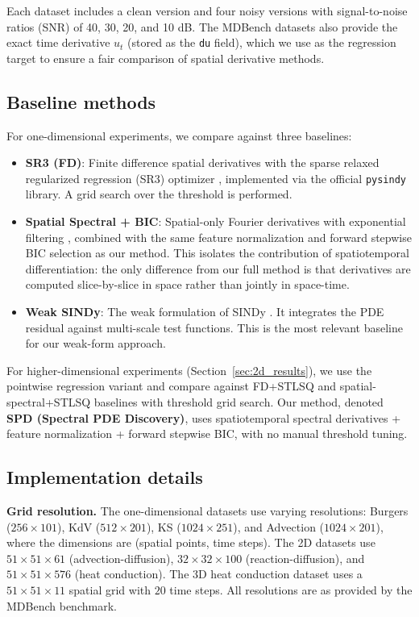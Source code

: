 \documentclass[preprint,12pt]{elsarticle}
\begin{document}
Each dataset includes a clean version and four noisy versions with signal-to-noise ratios (SNR) of 40, 30, 20, and 10 dB. The MDBench datasets also provide the exact time derivative $u_t$ (stored as the \texttt{du} field), which we use as the regression target to ensure a fair comparison of spatial derivative methods.

\subsection{Baseline methods}

For one-dimensional experiments, we compare against three baselines:
\begin{itemize}
\item \textbf{SR3 (FD)}: Finite difference spatial derivatives with the sparse relaxed regularized regression (SR3) optimizer \cite{kaheman2020sindypi}, implemented via the official \texttt{pysindy} library. A grid search over the threshold is performed.
\item \textbf{Spatial Spectral + BIC}: Spatial-only Fourier derivatives with exponential filtering \cite{schaeffer2017learning}, combined with the same feature normalization and forward stepwise BIC selection as our method. This isolates the contribution of spatiotemporal differentiation: the only difference from our full method is that derivatives are computed slice-by-slice in space rather than jointly in space-time.
\item \textbf{Weak SINDy}: The weak formulation of SINDy \cite{messenger2021weak}. It integrates the PDE residual against multi-scale test functions. This is the most relevant baseline for our weak-form approach.
\end{itemize}

For higher-dimensional experiments (Section~\ref{sec:2d_results}), we use the pointwise regression variant and compare against FD+STLSQ and spatial-spectral+STLSQ baselines with threshold grid search. Our method, denoted \textbf{SPD (Spectral PDE Discovery)}, uses spatiotemporal spectral derivatives + feature normalization + forward stepwise BIC, with no manual threshold tuning.

\subsection{Implementation details}
\label{sec:impl}

\textbf{Grid resolution.} The one-dimensional datasets use varying resolutions: Burgers ($256\times101$), KdV ($512\times201$), KS ($1024\times251$), and Advection ($1024\times201$), where the dimensions are (spatial points, time steps). The 2D datasets use $51\times51\times61$ (advection-diffusion), $32\times32\times100$ (reaction-diffusion), and $51\times51\times576$ (heat conduction). The 3D heat conduction dataset uses a $51\times51\times11$ spatial grid with $20$ time steps. All resolutions are as provided by the MDBench benchmark.
\end{document}
